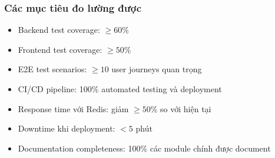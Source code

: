 \subsubsection{Các mục tiêu đo lường được}

\begin{itemize}
    \item Backend test coverage: $\geq 60\%$
    \item Frontend test coverage: $\geq 50\%$
    \item E2E test scenarios: $\geq 10$ user journeys quan trọng
    \item CI/CD pipeline: 100\% automated testing và deployment
    \item Response time với Redis: giảm $\geq 50\%$ so với hiện tại
    \item Downtime khi deployment: $< 5$ phút
    \item Documentation completeness: 100\% các module chính được document
\end{itemize}
